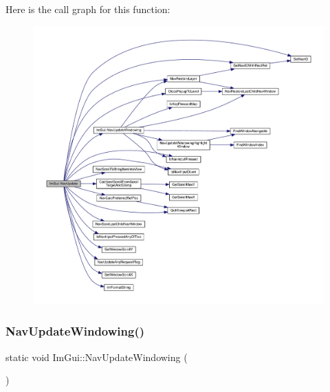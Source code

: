 Here is the call graph for this function\+:
\nopagebreak
\begin{figure}[H]
\begin{center}
\leavevmode
\includegraphics[width=350pt]{df/d13/namespace_im_gui_aab7d3ffa460af6604421e8c2d8bdef19_cgraph}
\end{center}
\end{figure}
\mbox{\label{namespace_im_gui_ad00213b916de0bc1519d6d20259391cf}} 
\subsubsection{\texorpdfstring{Nav\+Update\+Windowing()}{NavUpdateWindowing()}}
{\footnotesize\ttfamily static void Im\+Gui\+::\+Nav\+Update\+Windowing (\begin{DoxyParamCaption}{ }\end{DoxyParamCaption})\hspace{0.3cm}{\ttfamily [static]}}

